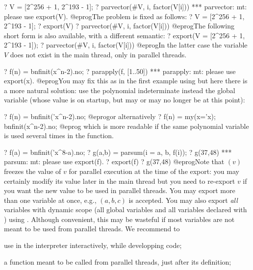 
\bprog
? V = [2^256 + 1, 2^193 - 1];
? parvector(#V, i, factor(V[i]))
  *** parvector: mt: please use export(V).
@eprog\noindent The problem is fixed as follows:
\bprog
? V = [2^256 + 1, 2^193 - 1];
? export(V)
? parvector(#V, i, factor(V[i]))
@eprog\noindent The following short form is also available, with a different
semantic:
\bprog
? export(V = [2^256 + 1, 2^193 - 1]);
? parvector(#V, i, factor(V[i]))
@eprog\noindent In the latter case the variable $V$ does not exist in the
main thread, only in parallel threads.


\bprog
? f(n) = bnfinit(x^n-2).no;
? parapply(f, [1..50])
  *** parapply: mt: please use export(x).
@eprog\noindent You may fix this as in the first example using 
but here there is a more natural solution: use the polynomial indeterminate
 instead the global variable  (whose value is  on
startup, but may or may no longer be  at this point):

\bprog
? f(n) = bnfinit('x^n-2).no;
@eprog\noindent or alternatively
\bprog
? f(n) = my(x='x); bnfinit(x^n-2).no;
@eprog
which is more readable if the same polynomial variable is used several times
in the function.


\bprog
? f(a) = bnfinit('x^8-a).no;
? g(a,b) = parsum(i = a, b, f(i));
? g(37,48)
  *** parsum: mt: please use export(f).
? export(f)
? g(37,48)
@eprog\noindent Note that $(v)$ freezes the value of $v$
for parallel execution at the time of the export: you may certainly modify
its value later in the main thread but you need to re-export $v$ if you want
the new value to be used in parallel threads. You may export more than one
variable at once, e.g., $(a,b,c)$ is accepted. You may also
export \emph{all} variables with dynamic scope (all global variables
and all variables declared with ) using .
Although convenient, this may be wasteful if most variables are not meant to
be used from parallel threads. We recommend to

\item use  in the  interpreter interactively, while
  developping code;

\item {} a function meant to be called from parallel
  threads, just after its definition;

